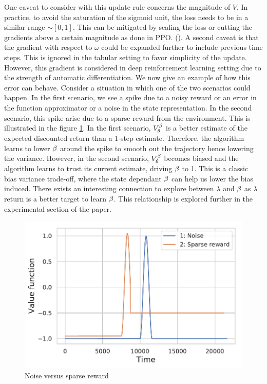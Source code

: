 One caveat to consider with this update rule concerns the magnitude of $V$. In practice, to avoid the saturation of the sigmoid unit, the loss needs to be in a similar range $\sim [0,1]$. This can be mitigated by scaling the loss or cutting the gradients above a certain magnitude as done in PPO. (\cite{schulman2017proximal}).
A second caveat is that the gradient with respect to $\omega$ could be expanded further to include previous time steps. This is ignored in the tabular setting to favor simplicity of the update. However, this gradient is considered in deep reinforcement learning setting due to the strength of automatic differentiation.
We now give an example of how this error can behave. Consider a situation in which one of the two scenarios could happen. In the first scenario, we see a spike due to a noisy reward or an error in the function approximator or a noise in the state representation. In the second scenario, this spike arise due to a sparse reward from the environment. This is illustrated in the figure \ref{fig:noise}. In the first scenario, $V^{\beta}_{\theta}$ is a better estimate of the expected discounted return than a 1-step estimate. Therefore, the algorithm learns to lower $\beta$ around the spike to smooth out the trajectory hence lowering the variance. However, in the second scenario, $V^{\beta}_{\theta}$ becomes biased and the algorithm learns to trust its current estimate, driving $\beta$ to 1. This is a classic bias variance trade-off, where the state dependant $\beta$ can help us lower the bias induced. There exists an interesting connection to explore between $\lambda$ and $\beta$ as $\lambda$ return is a better target to learn $\beta$. This relationship is explored further in the experimental section of the paper.

\begin{figure}[h]
    \centering
    \includegraphics[scale=0.5]{fig/noise_sparse.pdf}
    \caption{Noise versus sparse reward}
    \label{fig:noise}
\end{figure}

